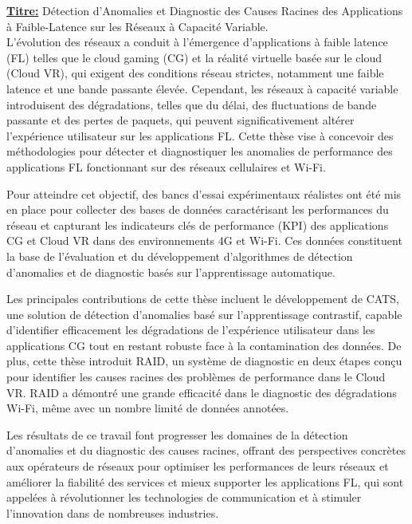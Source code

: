 \documentclass[11pt, nofrench]{thesul}
\theoremstyle{definition}
\begin{document}
\begin{ThesisAbstract}
    \begin{FrenchAbstract}
\begin{mdframed}
    \textbf{\underline{Titre:}} Détection d'Anomalies et Diagnostic des Causes Racines des Applications à Faible-Latence sur les Réseaux à Capacité Variable. \\
    
        L'évolution des réseaux a conduit à l'émergence d'applications à faible latence (FL) telles que le cloud gaming (CG) et la réalité virtuelle basée sur le cloud (Cloud VR), qui exigent des conditions réseau strictes, notamment une faible latence et une bande passante élevée. Cependant, les réseaux à capacité variable introduisent des dégradations, telles que du délai, des fluctuations de bande passante et des pertes de paquets, qui peuvent significativement altérer l'expérience utilisateur sur les applications FL. Cette thèse vise à concevoir des méthodologies pour détecter et diagnostiquer les anomalies de performance des applications FL fonctionnant sur des réseaux cellulaires et Wi-Fi.

        Pour atteindre cet objectif, des bancs d'essai expérimentaux réalistes ont été mis en place pour collecter des bases de données caractérisant les performances du réseau et capturant les indicateurs clés de performance (KPI) des applications CG et Cloud VR dans des environnements 4G et Wi-Fi. Ces données constituent la base de l'évaluation et du développement d'algorithmes de détection d'anomalies et de diagnostic basés sur l'apprentissage automatique.

        Les principales contributions de cette thèse incluent le développement de CATS, une solution de détection d'anomalies basé sur l'apprentissage contrastif, capable d'identifier efficacement les dégradations de l'expérience utilisateur dans les applications CG tout en restant robuste face à la contamination des données. De plus, cette thèse introduit RAID, un système de diagnostic en deux étapes conçu pour identifier les causes racines des problèmes de performance dans le Cloud VR. RAID a démontré une grande efficacité dans le diagnostic des dégradations Wi-Fi, même avec un nombre limité de données annotées.

        Les résultats de ce travail font progresser les domaines de la détection d'anomalies et du diagnostic des causes racines, offrant des perspectives concrètes aux opérateurs de réseaux pour optimiser les performances de leurs réseaux et améliorer la fiabilité des services et mieux supporter les applications FL, qui sont appelées à révolutionner les technologies de communication et à stimuler l'innovation dans de nombreuses industries.
\end{mdframed}        
    \end{FrenchAbstract}
    

\end{ThesisAbstract}
\end{document}
